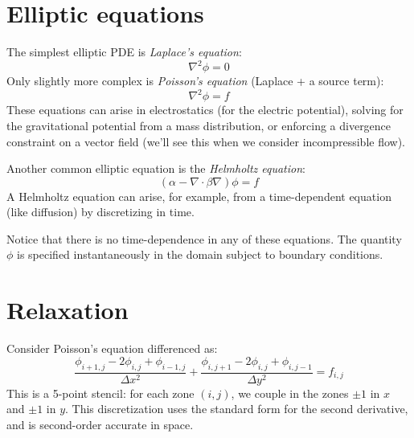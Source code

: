 \begin{quote}
\end{quote}

\section{Elliptic equations}

The simplest elliptic PDE is {\em Laplace's equation}:
\begin{equation}
\nabla^2 \phi = 0
\end{equation}
Only slightly more complex is {\em Poisson's equation} (Laplace + a source term):
\begin{equation}
\nabla^2 \phi = f
\end{equation}
These equations can arise in electrostatics (for the electric potential),
solving for the gravitational potential from a mass distribution, or
enforcing a divergence constraint on a vector field (we'll see this
when we consider incompressible flow).

Another common elliptic equation is the {\em Helmholtz equation}:
\begin{equation}
(\alpha - \nabla \cdot \beta \nabla) \phi = f
\end{equation}
A Helmholtz equation can arise, for example, from a time-dependent
equation (like diffusion) by discretizing in time.

Notice that there is no time-dependence in any of these equations.
The quantity $\phi$ is specified instantaneously in the domain subject to
boundary conditions.


\section{Relaxation}

Consider Poisson's equation differenced as:
\begin{equation}
\frac{\phi_{i+1,j} - 2 \phi_{i,j} + \phi_{i-1,j}}{\Delta x^2} +
\frac{\phi_{i,j+1} - 2 \phi_{i,j} + \phi_{i,j-1}}{\Delta y^2} = f_{i,j}
\end{equation}
This is a 5-point stencil: for each zone $(i,j)$, we couple in the
zones $\pm 1$ in $x$ and $\pm 1$ in $y$.  This discretization uses
the standard form for the second derivative, and is second-order
accurate in space.  

